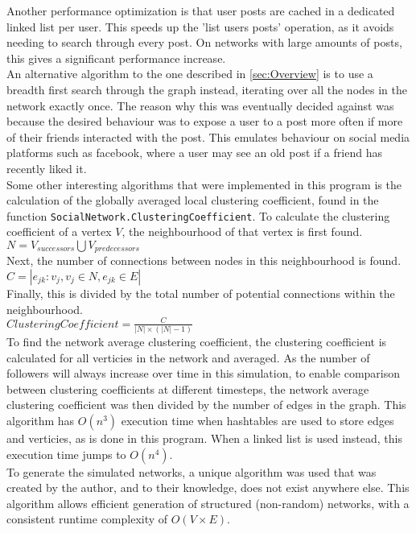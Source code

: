\documentclass{article}
\begin{document}
Another performance optimization is that user posts are cached in a dedicated linked list per user.
This speeds up the 'list users posts' operation, as it avoids needing to search through every post. On networks with large amounts
of posts, this gives a significant performance increase.\\

An alternative algorithm to the one described in \autoref{sec:Overview} is to use a breadth first search through the graph instead,
iterating over all the nodes in the network exactly once. The reason why this was eventually decided against was because
the desired behaviour was to expose a user to a post more often if more of their friends interacted with the post.
This emulates behaviour on social media
platforms such as facebook, where a user may see an old post if a friend has recently liked it.\\

Some other interesting algorithms that were implemented in this program is the calculation of the globally averaged local clustering coefficient, found in the
function \texttt{SocialNetwork.ClusteringCoefficient}.
To calculate the clustering coefficient of a vertex $V$, the neighbourhood of that
vertex is first found.\\
$N = V_{successors} \bigcup V_{predecessors}$\\
Next, the number of connections between nodes in this neighbourhood is found.\\
$C = |{e_{jk} : v_j, v_j \in N, e_{jk} \in E}|$\\
Finally, this is divided by the total number of potential connections within the neighbourhood.\\
$\mathit{Clustering Coefficient} = \frac{C}{|N| \times (|N| - 1)}$\\
To find the network average clustering coefficient, the clustering coefficient
is calculated for all verticies in the network and averaged.
As the number of followers will always increase over time in this simulation,
to enable comparison between clustering coefficients at different timesteps,
the network average clustering coefficient was then divided by the number
of edges in the graph.
This algorithm has $O\left(n^3\right)$ execution time when hashtables are used to store
edges and verticies, as is done in this program. When a linked list is used instead, this execution time jumps to
$O\left(n^4\right)$.\\

To generate the simulated networks, a unique algorithm was used
that was created by the author, and to their knowledge, does not exist anywhere else.
This algorithm allows efficient generation of structured (non-random) networks,
with a consistent runtime complexity of $O\left(V \times E\right)$.
\end{document}
